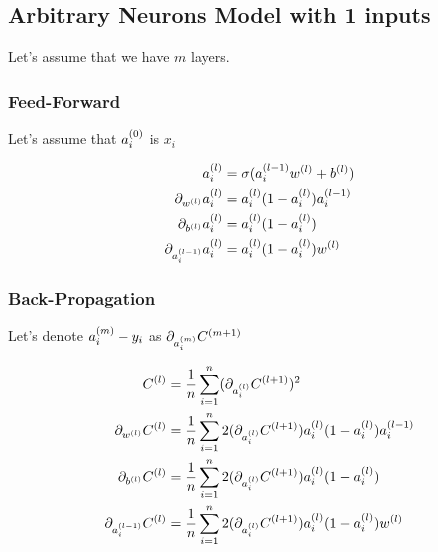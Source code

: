 \documentclass{article}
\begin{document}
\subsection{Arbitrary Neurons Model with 1 inputs}

Let's assume that we have $m$ layers.

\subsubsection{Feed-Forward}

Let's assume that $a_i\s[0]$ is $x_i$

\begin{align}
    a_i\s[l] &= \sigma(a_i\s[l-1]w\s[l] + b\s[l]) \\
    \pd[{w\s[l]}]a_i\s[l] &= a_i\s[l](1 - a_i\s[l])a_i\s[l-1] \\
    \pd[{b\s[l]}]a_i\s[l] &= a_i\s[l](1 - a_i\s[l]) \\
    \pd[{a_i\s[l-1]}]a_i\s[l] &= a_i\s[l](1 - a_i\s[l])w\s[l] \\
\end{align}

\subsubsection{Back-Propagation}

Let's denote $a_i\s[m] - y_i$ as $\pd[{a_i\s[m]}]C\s[m+1]$

\begin{align}
    C\s[l]
        &= \avgsum[i, n] (\pd[{a_i\s[l]}]C\s[l+1])^2 \\
    \pd[{w\s[l]}]C\s[l]
        &= \avgsum[i, n] 2(\pd[{a_i\s[l]}]C\s[l+1]) a_i\s[l](1 - a_i\s[l])a_i\s[l-1] \\
    \pd[{b\s[l]}]C\s[l]
        &= \avgsum[i, n] 2(\pd[{a_i\s[l]}]C\s[l+1]) a_i\s[l](1 - a_i\s[l]) \\
    \pd[{a_i\s[l-1]}] C\s[l]
        &= \avgsum[i, n] 2(\pd[{a_i\s[l]}]C\s[l+1])a_i\s[l](1 - a_i\s[l])w\s[l]
\end{align}
\end{document}
